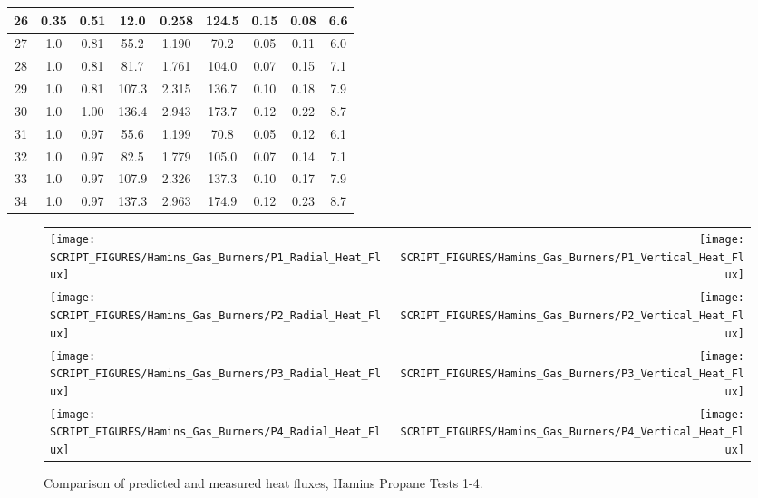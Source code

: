 \begin{table}[!h]
\begin{center}
\begin{tabular}{|c|c|c|c|c|c|c||c|c|}
26       & 0.35     & 0.51       & 12.0        &  0.258                &  124.5         & 0.15          & 0.08      & 6.6          \\ \hline
27       & 1.0      & 0.81       & 55.2        &  1.190                &  70.2          & 0.05          & 0.11      & 6.0          \\ \hline
28       & 1.0      & 0.81       & 81.7        &  1.761                &  104.0         & 0.07          & 0.15      & 7.1          \\ \hline
29       & 1.0      & 0.81       & 107.3       &  2.315                &  136.7         & 0.10          & 0.18      & 7.9          \\ \hline
30       & 1.0      & 1.00       & 136.4       &  2.943                &  173.7         & 0.12          & 0.22      & 8.7          \\ \hline
31       & 1.0      & 0.97       & 55.6        &  1.199                &  70.8          & 0.05          & 0.12      & 6.1          \\ \hline
32       & 1.0      & 0.97       & 82.5        &  1.779                &  105.0         & 0.07          & 0.14      & 7.1          \\ \hline
33       & 1.0      & 0.97       & 107.9       &  2.326                &  137.3         & 0.10          & 0.17      & 7.9          \\ \hline
34       & 1.0      & 0.97       & 137.3       &  2.963                &  174.9         & 0.12          & 0.23      & 8.7          \\ \hline
\end{tabular}
\end{center}
\label{Hamins_Propane_Table}
\end{table}

\newpage


\begin{figure}[p]
\begin{tabular*}{\textwidth}{l@{\extracolsep{\fill}}r}
\texttt{[image: SCRIPT\_FIGURES/Hamins\_Gas\_Burners/P1\_Radial\_Heat\_Flux]} &
\texttt{[image: SCRIPT\_FIGURES/Hamins\_Gas\_Burners/P1\_Vertical\_Heat\_Flux]} \\
\texttt{[image: SCRIPT\_FIGURES/Hamins\_Gas\_Burners/P2\_Radial\_Heat\_Flux]} &
\texttt{[image: SCRIPT\_FIGURES/Hamins\_Gas\_Burners/P2\_Vertical\_Heat\_Flux]} \\
\texttt{[image: SCRIPT\_FIGURES/Hamins\_Gas\_Burners/P3\_Radial\_Heat\_Flux]} &
\texttt{[image: SCRIPT\_FIGURES/Hamins\_Gas\_Burners/P3\_Vertical\_Heat\_Flux]} \\
\texttt{[image: SCRIPT\_FIGURES/Hamins\_Gas\_Burners/P4\_Radial\_Heat\_Flux]} &
\texttt{[image: SCRIPT\_FIGURES/Hamins\_Gas\_Burners/P4\_Vertical\_Heat\_Flux]}
\end{tabular*}
\label{Hamins_Propane_1-4}
\caption[Heat flux predictions, Hamins propane burner Tests 1-4]
{Comparison of predicted and measured heat fluxes, Hamins Propane Tests 1-4.}
\end{figure}

